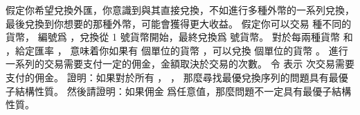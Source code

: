 \startEXERCISE
假定你希望兌換外匯，你意識到與其直接兌換，不如進行多種外幣的一系列兌換，
最後兌換到你想要的那種外幣，可能會獲得更大收益。
假定你可以交易  種不同的貨幣，
編號爲 ，兌換從 1 號貨幣開始，最終兌換爲  號貨幣。
對於每兩種貨幣  和 ，給定匯率 ，
意味着你如果有  個單位的貨幣 ，可以兌換  個單位的貨幣 。
進行一系列的交易需要支付一定的佣金，金額取決於交易的次數。
令  表示  次交易需要支付的佣金。
證明：如果對於所有 ， ，
那麼尋找最優兌換序列的問題具有最優子結構性質。
然後請證明：如果佣金  爲任意值，那麼問題不一定具有最優子結構性質。
\stopEXERCISE

\startANSWER
{}
\stopANSWER

\stopsection
